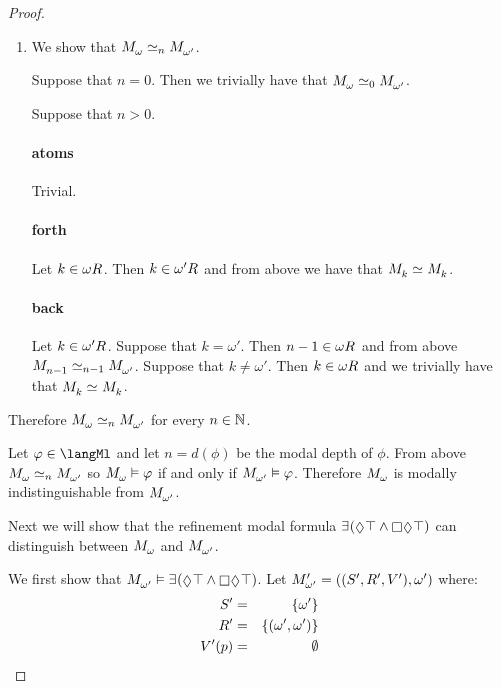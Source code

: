 \begin{proof}
\begin{enumerate}
    \item We show that $\kPModel{\omega} \bisimilar[n] \kPModel{\omega'}$.

        Suppose that $n = 0$. Then we trivially have that $\kPModel{\omega} \bisimilar[0] \kPModel{\omega'}$.

        Suppose that $n > 0$.

        \paragraph{atoms} Trivial.

        \paragraph{forth} Let $k \in \kSuccessors{}{\omega}$. Then $k \in \kSuccessors{}{\omega'}$ and from above we have that $\kPModel{k} \bisimilar \kPModel{k}$.

        \paragraph{back} Let $k \in \kSuccessors{}{\omega'}$.
        Suppose that $k = \omega'$. Then $n - 1 \in \kSuccessors{}{\omega}$ and from above $\kPModel{n - 1} \bisimilar[n - 1] \kPModel{\omega'}$.
        Suppose that $k \neq \omega'$. Then $k \in \kSuccessors{}{\omega}$ and we trivially have that $\kPModel{k} \bisimilar \kPModel{k}$.
\end{enumerate}

Therefore $\kPModel{\omega} \bisimilar[n] \kPModel{\omega'}$ for every $n \in \mathbb{N}$.

Let $\phi \in \langMl$ and let $n = d(\phi)$ be the modal depth of $\phi$.
From above $\kPModel{\omega} \bisimilar[n] \kPModel{\omega'}$ so $\kPModel{\omega} \entails \phi$ if and only if $\kPModel{\omega'} \entails \phi$.
Therefore $\kPModel{\omega}$ is modally indistinguishable from $\kPModel{\omega'}$.

Next we will show that the refinement modal formula $\somerefs (\possible \top \land \necessary \possible \top)$ can distinguish between $\kPModel{\omega}$ and $\kPModel{\omega'}$.

We first show that $\kPModel{\omega'} \entails \somerefs (\possible \top \land \necessary \possible \top)$.
Let $\kPModelAndTupleP{\omega'}$ where:
\begin{eqnarray*}
    {S^{\prime}} &=& \{\omega'\}\\
    {R^{\prime}_{}} &=& \{(\omega', \omega')\}\\
    {V^{\prime}}(p) &=& \emptyset
\end{eqnarray*}


\end{proof}
